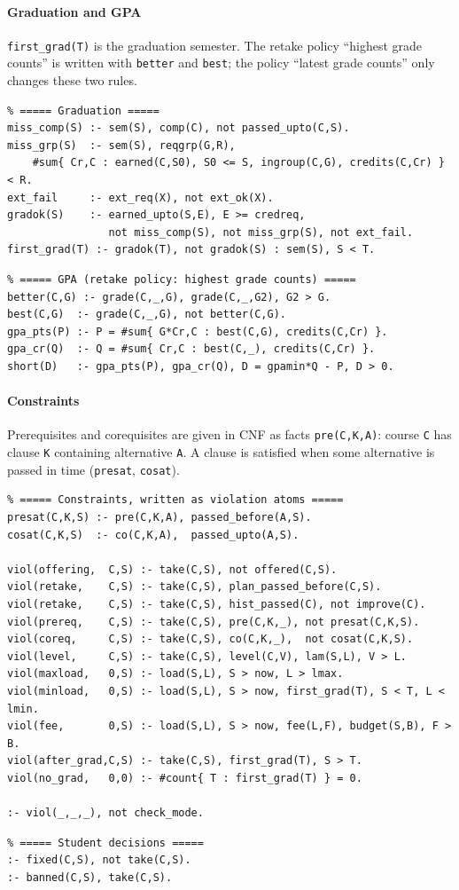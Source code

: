 \paragraph{Graduation and GPA}
\texttt{first\_grad(T)} is the graduation semester. The retake policy
``highest grade counts'' is written with \texttt{better} and \texttt{best};
the policy ``latest grade counts'' only changes these two rules.
\begin{lstlisting}
% ===== Graduation =====
miss_comp(S) :- sem(S), comp(C), not passed_upto(C,S).
miss_grp(S)  :- sem(S), reqgrp(G,R),
    #sum{ Cr,C : earned(C,S0), S0 <= S, ingroup(C,G), credits(C,Cr) } < R.
ext_fail     :- ext_req(X), not ext_ok(X).
gradok(S)    :- earned_upto(S,E), E >= credreq,
                not miss_comp(S), not miss_grp(S), not ext_fail.
first_grad(T) :- gradok(T), not gradok(S) : sem(S), S < T.
\end{lstlisting}
\begin{lstlisting}
% ===== GPA (retake policy: highest grade counts) =====
better(C,G) :- grade(C,_,G), grade(C,_,G2), G2 > G.
best(C,G)  :- grade(C,_,G), not better(C,G).
gpa_pts(P) :- P = #sum{ G*Cr,C : best(C,G), credits(C,Cr) }.
gpa_cr(Q)  :- Q = #sum{ Cr,C : best(C,_), credits(C,Cr) }.
short(D)   :- gpa_pts(P), gpa_cr(Q), D = gpamin*Q - P, D > 0.
\end{lstlisting}
 
\paragraph{Constraints}
Prerequisites and corequisites are given in CNF as facts
\texttt{pre(C,K,A)}: course \texttt{C} has clause \texttt{K} containing
alternative \texttt{A}. A clause is satisfied when some alternative is
passed in time (\texttt{presat}, \texttt{cosat}).
\begin{lstlisting}
% ===== Constraints, written as violation atoms =====
presat(C,K,S) :- pre(C,K,A), passed_before(A,S).
cosat(C,K,S)  :- co(C,K,A),  passed_upto(A,S).
 
viol(offering,  C,S) :- take(C,S), not offered(C,S).
viol(retake,    C,S) :- take(C,S), plan_passed_before(C,S).
viol(retake,    C,S) :- take(C,S), hist_passed(C), not improve(C).
viol(prereq,    C,S) :- take(C,S), pre(C,K,_), not presat(C,K,S).
viol(coreq,     C,S) :- take(C,S), co(C,K,_),  not cosat(C,K,S).
viol(level,     C,S) :- take(C,S), level(C,V), lam(S,L), V > L.
viol(maxload,   0,S) :- load(S,L), S > now, L > lmax.
viol(minload,   0,S) :- load(S,L), S > now, first_grad(T), S < T, L < lmin.
viol(fee,       0,S) :- load(S,L), S > now, fee(L,F), budget(S,B), F > B.
viol(after_grad,C,S) :- take(C,S), first_grad(T), S > T.
viol(no_grad,   0,0) :- #count{ T : first_grad(T) } = 0.
 
:- viol(_,_,_), not check_mode.
\end{lstlisting}
\begin{lstlisting}
% ===== Student decisions =====
:- fixed(C,S), not take(C,S).
:- banned(C,S), take(C,S).
\end{lstlisting}
 
